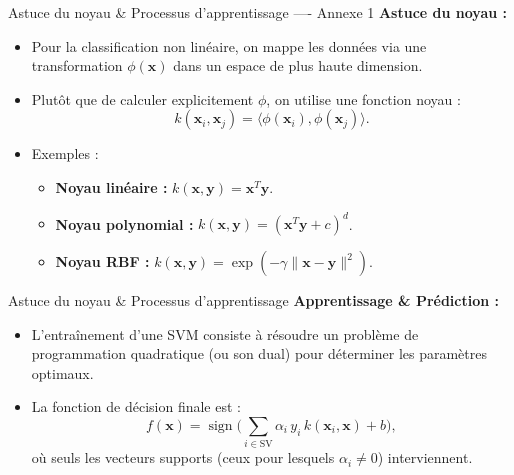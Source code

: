 \documentclass{beamer}
\begin{document}
\begin{frame}{Astuce du noyau \& Processus d'apprentissage ---- Annexe 1}
    \textbf{Astuce du noyau :}
    \begin{itemize}
        \item Pour la classification non linéaire, on mappe les données via une transformation \(\phi(\mathbf{x})\) dans un espace de plus haute dimension.
        \item Plutôt que de calculer explicitement \(\phi\), on utilise une fonction noyau :
        \[
        k(\mathbf{x}_i, \mathbf{x}_j) = \langle \phi(\mathbf{x}_i), \phi(\mathbf{x}_j) \rangle.
        \]
        \item Exemples :
        \begin{itemize}
            \item \textbf{Noyau linéaire :} \(k(\mathbf{x}, \mathbf{y}) = \mathbf{x}^T\mathbf{y}\).
            \item \textbf{Noyau polynomial :} \(k(\mathbf{x}, \mathbf{y}) = (\mathbf{x}^T\mathbf{y} + c)^d\).
            \item \textbf{Noyau RBF :} \(k(\mathbf{x}, \mathbf{y}) = \exp(-\gamma \|\mathbf{x} - \mathbf{y}\|^2)\).
        \end{itemize}
    \end{itemize}
\end{frame}
\begin{frame}{Astuce du noyau \& Processus d'apprentissage}
    \vspace{1em}
    \textbf{Apprentissage \& Prédiction :}
    \begin{itemize}
        \item L'entraînement d'une SVM consiste à résoudre un problème de programmation quadratique (ou son dual) pour déterminer les paramètres optimaux.
        \item La fonction de décision finale est :
        \[
        f(\mathbf{x}) = \operatorname{sign}\Biggl(\sum_{i \in \mathrm{SV}} \alpha_i\, y_i\, k(\mathbf{x}_i, \mathbf{x}) + b\Biggr),
        \]
        où seuls les vecteurs supports (ceux pour lesquels \(\alpha_i \neq 0\)) interviennent.
    \end{itemize}
\end{frame}
\end{document}

